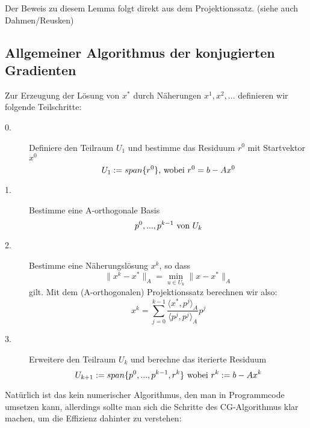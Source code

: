 Der Beweis zu diesem Lemma folgt direkt aus dem Projektionssatz. (siehe auch Dahmen/Reusken) \\

\subsection{Allgemeiner Algorithmus der konjugierten Gradienten}\label{ss.Allgemeiner CG-Algorithmus}

Zur Erzeugung der Lösung von $x^{*}$ durch Näherungen $x^{1}, x^{2},...$ definieren wir folgende Teilschritte:

\begin{description}

\item[0.] Definiere den Teilraum $U_{1}$ und bestimme das Residuum $r^{0}$ mit Startvektor $x^{0}$
\begin{equation}
U_{1} := span\{r^{0}\} \textnormal{, wobei } r^{0} = b - Ax^{0}
\end{equation}

\item[1.] Bestimme eine A-orthogonale Basis
\begin{equation}
p^{0},...,p^{k-1} \textnormal{ von } U_{k}
\end{equation}

\item[2.] Bestimme eine Näherungslösung $x^{k}$, so dass
\begin{equation}
\|x^{k} - x^{*}\|_{A} = \underset{u \in U_{k}}{\min} \|x - x^{*}\|_{A}
\end{equation}
gilt. Mit dem (A-orthogonalen) Projektionssatz berechnen wir also:
\begin{equation}
x^{k} = \sum_{j=0}^{k-1} \frac {\langle x^{*}, p^{j} \rangle _{A}} {\langle p^{j}, p^{j} \rangle _{A}} p^{j}
\end{equation}

\item[3.] Erweitere den Teilraum $U_{k}$ und berechne das iterierte Residuum
\begin{equation}
U_{k+1} := span\{p^{0},...,p^{k-1},r^{k}\} \textnormal{ wobei } r^{k} := b - Ax^{k}
\end{equation}

\end{description}

Natürlich ist das kein numerischer Algorithmus, den man in Programmcode umsetzen kann, allerdings sollte man sich die Schritte des CG-Algorithmus klar machen, um die Effizienz dahinter zu verstehen:

